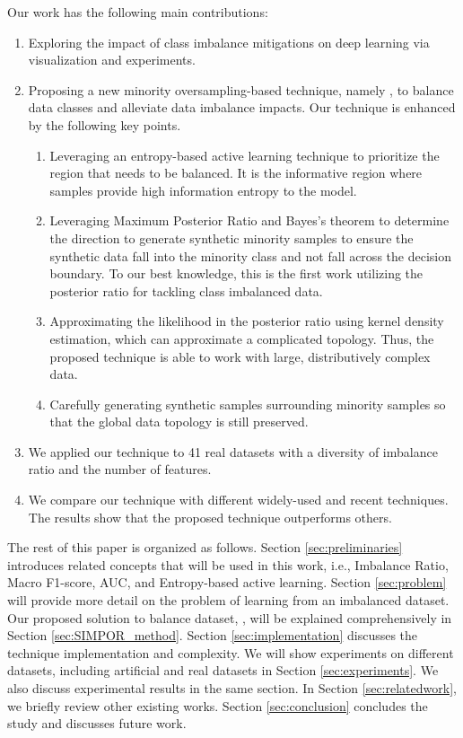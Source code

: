 Our work has the following main contributions:
\begin{enumerate}
	\item{Exploring the impact of class imbalance mitigations on deep learning via visualization and experiments.}
	\item{Proposing a new minority oversampling-based technique, namely \MethodnameLongSIMPOR, to balance data classes and alleviate data imbalance impacts. Our technique is enhanced by the following key points.}
	\begin{enumerate}
		\item Leveraging an entropy-based active learning technique to prioritize the region that needs to be balanced. It is the informative region where samples provide high information entropy to the model. 
		\item Leveraging Maximum Posterior Ratio and Bayes's theorem to determine the direction to generate synthetic minority samples to ensure the synthetic data fall into the minority class and not fall across the decision boundary. To our best knowledge, this is the first work utilizing the posterior ratio for tackling class imbalanced data. 
		\item Approximating the likelihood in the posterior ratio using kernel density estimation, which can approximate a complicated topology. Thus, the proposed technique is able to work with large, distributively complex data. 
		\item Carefully generating synthetic samples surrounding minority samples so that the global data topology is still preserved. 
	\end{enumerate}
	\item{We applied our technique to 41 real datasets with a diversity of imbalance ratio and the number of features.}
	\item{We compare our technique with different widely-used and recent techniques. The results show that the proposed technique outperforms others.}
\end{enumerate}


The rest of this paper is organized as follows. Section \ref{sec:preliminaries} introduces related concepts that will be used in this work, i.e., Imbalance Ratio, Macro F1-score, AUC, and Entropy-based active learning. Section \ref{sec:problem} will provide more detail on the problem of learning from an imbalanced dataset. Our proposed solution to balance dataset, \MethodnameLongSIMPOR, will be explained comprehensively in Section \ref{sec:SIMPOR_method}. Section \ref{sec:implementation} discusses the technique implementation and complexity. We will show experiments on different datasets, including artificial and real datasets in Section \ref{sec:experiments}. We also discuss experimental results in the same section. In Section \ref{sec:relatedwork}, we briefly review other existing works. Section \ref{sec:conclusion} concludes the study and discusses future work. 

